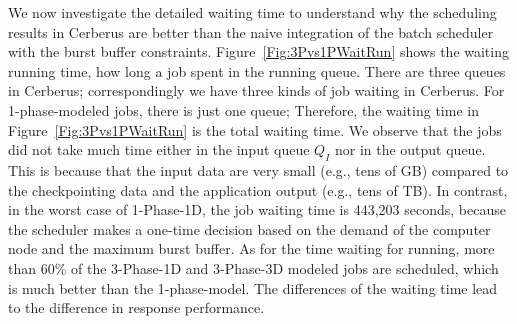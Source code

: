 We now investigate the detailed waiting time to understand why the scheduling results in Cerberus
are better than the naive integration of the batch scheduler with the burst buffer constraints.
Figure~\ref{Fig:3Pvs1PWaitRun} shows the waiting running time, how long a job spent in the running queue.
There are three queues in Cerberus;
correspondingly we have three kinds of job waiting in Cerberus.
For 1-phase-modeled jobs, there is just one queue;
Therefore, the waiting time in Figure~\ref{Fig:3Pvs1PWaitRun} is the total waiting time.
We observe that the jobs did not take much time either in the input queue $Q_I$ nor in the output queue.
This is because that the input data are very small (e.g., tens of GB)
compared to the checkpointing data and the application output (e.g., tens of TB).
In contrast, in the worst case of 1-Phase-1D, the job waiting time is 443,203 seconds,
because the scheduler makes a one-time decision based on the demand of the computer node and the maximum burst buffer.
As for the time waiting for running, more than 60\% of the 3-Phase-1D and 3-Phase-3D modeled jobs are scheduled,
which is much better than the 1-phase-model.
The differences of the waiting time lead to the difference in response performance.



